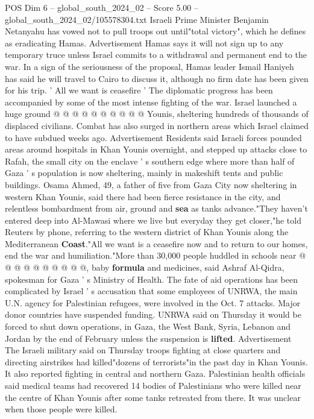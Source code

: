 \begin{textsample}{POS Dim 6 – global\_south\_2024\_02 – Score 5.00 – global\_south\_2024\_02/105578304.txt}
Israeli Prime Minister Benjamin Netanyahu has vowed not to pull troops out until"total victory", which he defines as eradicating Hamas.
Advertisement Hamas says it will not sign up to any temporary truce unless Israel commits to a withdrawal and permanent end to the war.
In a sign of the seriousness of the proposal, Hamas leader Ismail Haniyeh has said he will travel to Cairo to discuss it, although no firm date has been given for his trip. ' All we want is ceasefire ' The diplomatic progress has been accompanied by some of the most intense fighting of the war.
Israel launched a huge ground @ @ @ @ @ @ @ @ @ @ Younis, sheltering hundreds of thousands of displaced civilians.
Combat has also surged in northern areas which Israel claimed to have subdued weeks ago.
Advertisement Residents said Israeli forces pounded areas around hospitals in Khan Younis overnight, and stepped up attacks close to Rafah, the small city on the enclave ' s southern edge where more than half of Gaza ' s population is now sheltering, mainly in makeshift tents and public buildings.
Osama Ahmed, 49, a father of five from Gaza City now sheltering in western Khan Younis, said there had been fierce resistance in the city, and relentless bombardment from air, ground and \textbf{sea} as tanks advance."They haven't entered deep into Al-Mawasi where we live but everyday they get closer,"he told Reuters by phone, referring to the western district of Khan Younis along the Mediterranean \textbf{Coast}."All we want is a ceasefire now and to return to our homes, end the war and humiliation."More than 30,000 people huddled in schools near @ @ @ @ @ @ @ @ @ @, baby \textbf{formula} and medicines, said Ashraf Al-Qidra, spokesman for Gaza ' s Ministry of Health.
The fate of aid operations has been complicated by Israel ' s accusation that some employees of UNRWA, the main U.N. agency for Palestinian refugees, were involved in the Oct. 7 attacks.
Major donor countries have suspended funding.
UNRWA said on Thursday it would be forced to shut down operations, in Gaza, the West Bank, Syria, Lebanon and Jordan by the end of February unless the suspension is \textbf{lifted}.
Advertisement The Israeli military said on Thursday troops fighting at close quarters and directing airstrikes had killed"dozens of terrorists"in the past day in Khan Younis.
It also reported fighting in central and northern Gaza.
Palestinian health officials said medical teams had recovered 14 bodies of Palestinians who were killed near the centre of Khan Younis after some tanks retreated from there.
It was unclear when those people were killed.

\end{textsample}
